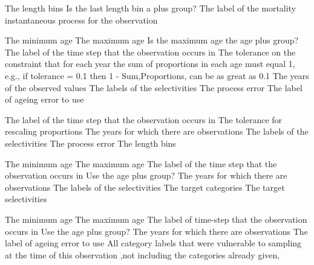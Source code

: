  {The length bins}
 {Is the last length bin a plus group?}
 {The label of the mortality instantaneous process for the observation}
\par\textbf{}\par
{} {The minimum age}
 {The maximum age}
 {Is the maximum age the age plus group?}
 {The label of the time step that the observation occurs in}
 {The tolerance on the constraint that for each year the sum of proportions in each age must equal 1, e.g., if tolerance = 0.1 then 1 - Sum,Proportions, can be as great as 0.1}
 {The years of the observed values}
 {The labels of the selectivities}
 {The process error}
 {The label of ageing error to use}
\par\textbf{}\par
{} {The label of the time step that the observation occurs in}
 {The tolerance for rescaling proportions}
 {The years for which there are observations}
 {The labels of the selectivities}
 {The process error}
 {The length bins}
\par\textbf{}\par
{} {The minimum age}
 {The maximum age}
 {The label of the time step that the observation occurs in}
 {Use the age plus group?}
 {The years for which there are observations}
 {The labels of the selectivities}
 {The target categories}
 {The target selectivities}
\par\textbf{}\par
{} {The minimum age}
 {The maximum age}
 {The label of time-step that the observation occurs in}
 {Use the age plus group?}
 {The years for which there are observations}
 {The label of ageing error to use}
 {All category labels that were vulnerable to sampling at the time of this observation ,not including the categories already given,}
